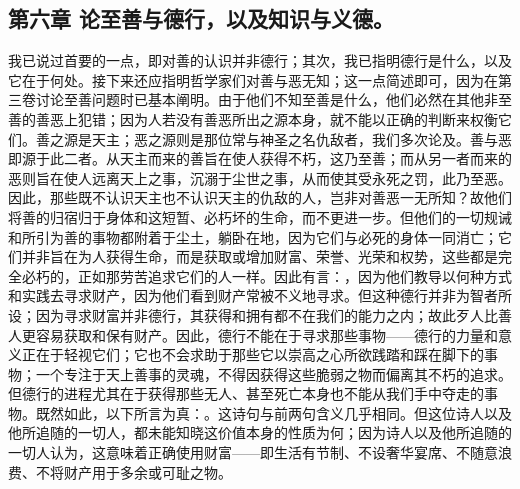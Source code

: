 
\subsection{第六章 论至善与德行，以及知识与义德。}

我已说过首要的一点，即对善的认识并非德行；其次，我已指明德行是什么，以及它在于何处。接下来还应指明哲学家们对善与恶无知；这一点简述即可，因为在第三卷讨论至善问题时已基本阐明。由于他们不知至善是什么，他们必然在其他非至善的善恶上犯错；因为人若没有善恶所出之源本身，就不能以正确的判断来权衡它们。善之源是天主；恶之源则是那位常与神圣之名仇敌者，我们多次论及。善与恶即源于此二者。从天主而来的善旨在使人获得不朽，这乃至善；而从另一者而来的恶则旨在使人远离天上之事，沉溺于尘世之事，从而使其受永死之罚，此乃至恶。因此，那些既不认识天主也不认识天主的仇敌的人，岂非对善恶一无所知？故他们将善的归宿归于身体和这短暂、必朽坏的生命，而不更进一步。但他们的一切规诫和所引为善的事物都附着于尘土，躺卧在地，因为它们与必死的身体一同消亡；它们并非旨在为人获得生命，而是获取或增加财富、荣誉、光荣和权势，这些都是完全必朽的，正如那劳苦追求它们的人一样。因此有言：，因为他们教导以何种方式和实践去寻求财产，因为他们看到财产常被不义地寻求。但这种德行并非为智者所设；因为寻求财富并非德行，其获得和拥有都不在我们的能力之内；故此歹人比善人更容易获取和保有财产。因此，德行不能在于寻求那些事物——德行的力量和意义正在于轻视它们；它也不会求助于那些它以崇高之心所欲践踏和踩在脚下的事物；一个专注于天上善事的灵魂，不得因获得这些脆弱之物而偏离其不朽的追求。但德行的进程尤其在于获得那些无人、甚至死亡本身也不能从我们手中夺走的事物。既然如此，以下所言为真：。这诗句与前两句含义几乎相同。但这位诗人以及他所追随的一切人，都未能知晓这价值本身的性质为何；因为诗人以及他所追随的一切人认为，这意味着正确使用财富——即生活有节制、不设奢华宴席、不随意浪费、不将财产用于多余或可耻之物。\par

